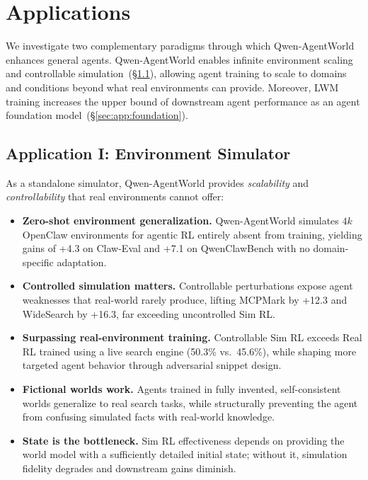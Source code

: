 \documentclass{llmxive}
\providecommand{\method}{Qwen-AgentWorld\xspace}
\begin{document}
\section{Applications}
\label{sec:applications}

We investigate two complementary paradigms through which \method enhances general agents.
\method enables infinite environment scaling and controllable simulation~(\S\ref{sec:app:simulator}), allowing agent training to scale to domains and conditions beyond what real environments can provide.
Moreover, LWM training increases the upper bound of downstream agent performance as an agent foundation model~(\S\ref{sec:app:foundation}).

\subsection{Application I: Environment Simulator}
\label{sec:app:simulator}

\begin{tcolorbox}[takeawaysbox]
\small
As a standalone simulator, \method provides \emph{scalability} and \emph{controllability} that real environments cannot offer:
\begin{itemize}[leftmargin=1.2em,itemsep=1pt,topsep=2pt]
\item \textbf{Zero-shot environment generalization.} \method simulates $4k$ OpenClaw environments for agentic RL entirely absent from training, yielding gains of +4.3 on Claw-Eval and +7.1 on QwenClawBench with no domain-specific adaptation.
\item \textbf{Controlled simulation matters.} Controllable perturbations expose agent weaknesses that real-world rarely produce, lifting MCPMark by +12.3 and WideSearch by +16.3, far exceeding uncontrolled Sim RL.
\item \textbf{Surpassing real-environment training.} Controllable Sim RL exceeds Real RL trained using a live search engine (50.3\% vs.\ 45.6\%), while shaping more targeted agent behavior through adversarial snippet design.
\item \textbf{Fictional worlds work.} Agents trained in fully invented, self-consistent worlds generalize to real search tasks, while structurally preventing the agent from confusing simulated facts with real-world knowledge.
\item \textbf{State is the bottleneck.} Sim RL effectiveness depends on providing the world model with a sufficiently detailed initial state; without it, simulation fidelity degrades and downstream gains diminish.
\end{itemize}
\end{tcolorbox}
\end{document}
